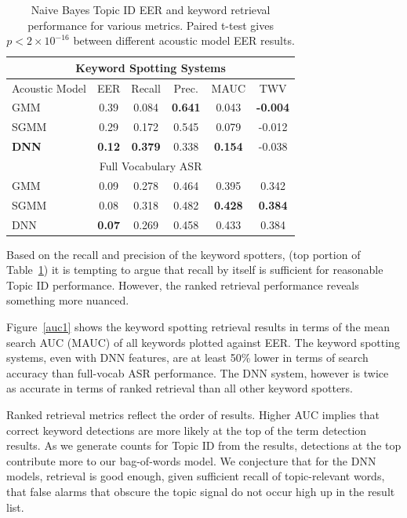 \begin{table}[t]
\centering
\begin{tabular}{l||c||c|c|c|c}\toprule
\multicolumn{6}{c}{Keyword Spotting Systems}\\\midrule
Acoustic Model & EER & Recall & Prec. & MAUC & TWV\\\midrule
GMM & 0.39 & 0.084  & \bf 0.641 & 0.043 & \bf -0.004 \\
SGMM & 0.29 & 0.172 & 0.545 & 0.079 & -0.012 \\
\textbf{DNN} & \textbf{0.12} & \textbf{0.379} & 0.338 & \textbf{0.154} & -0.038 \\\midrule
\multicolumn{6}{c}{Full Vocabulary ASR}\\\midrule
GMM & 0.09 & 0.278 & 0.464 & 0.395 & 0.342 \\
SGMM & 0.08 & 0.318 & 0.482 & \bf 0.428 & \bf 0.384 \\
DNN & \bf 0.07 & 0.269 & 0.458 & 0.433 & 0.384 \\ \bottomrule
\bottomrule
\end{tabular}
\caption[Topic ID EER and ranked keyword retrieval accuracy ]{\label{ch3KWSpotting} Naive Bayes Topic ID EER and keyword retrieval performance for various metrics.  Paired t-test gives $p < 2\times10^{-16}$ between different acoustic model EER results.}
\end{table}

Based on the recall and precision of the keyword spotters, (top portion of Table~\ref{ch3KWSpotting}) it is tempting to argue that recall by itself is sufficient for reasonable Topic ID performance.  However, the ranked retrieval performance reveals something more nuanced.   

Figure~\ref{auc1} shows the keyword spotting retrieval results in terms of the mean search AUC (MAUC) of all keywords plotted against EER.   The keyword spotting systems, even with DNN features, are at least 50\% lower in terms of search accuracy than full-vocab ASR performance.  The DNN system, however is twice as accurate in terms of ranked retrieval than all other keyword spotters.  

Ranked retrieval metrics reflect the order of results.  Higher AUC implies that correct keyword detections are more likely at the top of the term detection results.  As we generate counts for Topic ID from the results, detections at the top contribute more to our bag-of-words model.  We conjecture that for the DNN models, retrieval is good enough, given sufficient recall of topic-relevant words, that false alarms that obscure the topic signal do not occur high up in the result list. 


